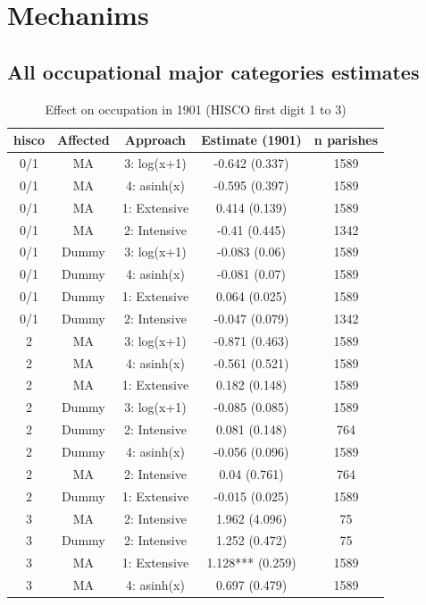 \section{Mechanims}

\FloatBarrier
\subsection{All occupational major categories estimates} 

\begin{table}
    \centering
    \caption{Effect on occupation in 1901 (HISCO first digit 1 to 3)} \label{tab:occ1}
    \footnotesize
    \begin{tabular}{ccccc}
\toprule
hisco & Affected & Approach & Estimate (1901) & n parishes\\
\midrule
0/1 & MA & 3: log(x+1) & -0.642 (0.337) & 1589\\
0/1 & MA & 4: asinh(x) & -0.595 (0.397) & 1589\\
0/1 & MA & 1: Extensive & 0.414 (0.139) & 1589\\
0/1 & MA & 2: Intensive & -0.41 (0.445) & 1342\\
0/1 & Dummy & 3: log(x+1) & -0.083 (0.06) & 1589\\
0/1 & Dummy & 4: asinh(x) & -0.081 (0.07) & 1589\\
0/1 & Dummy & 1: Extensive & 0.064 (0.025) & 1589\\
0/1 & Dummy & 2: Intensive & -0.047 (0.079) & 1342\\
2 & MA & 3: log(x+1) & -0.871 (0.463) & 1589\\
2 & MA & 4: asinh(x) & -0.561 (0.521) & 1589\\
2 & MA & 1: Extensive & 0.182 (0.148) & 1589\\
2 & Dummy & 3: log(x+1) & -0.085 (0.085) & 1589\\
2 & Dummy & 2: Intensive & 0.081 (0.148) & 764\\
2 & Dummy & 4: asinh(x) & -0.056 (0.096) & 1589\\
2 & MA & 2: Intensive & 0.04 (0.761) & 764\\
2 & Dummy & 1: Extensive & -0.015 (0.025) & 1589\\
3 & MA & 2: Intensive & 1.962 (4.096) & 75\\
3 & Dummy & 2: Intensive & 1.252 (0.472) & 75\\
3 & MA & 1: Extensive & 1.128*** (0.259) & 1589\\
3 & MA & 4: asinh(x) & 0.697 (0.479) & 1589\\

\end{tabular}
\end{table}
